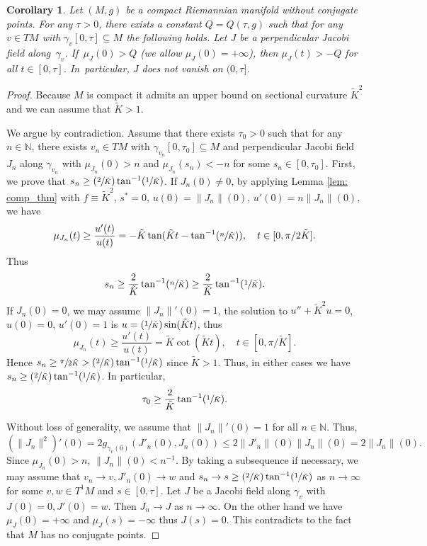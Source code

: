 \documentclass[JEP,XML,SOM,Unicode,NoFloatCountersInSection]{cedram}
\newcommand{\Psfrac}[2]{(\sfrac{#1}{#2})}
\newtheorem{corollary}[theorem]{Corollary}
\theoremstyle{definition}
\renewcommand{\>}{{\rangle}}
\newcommand{\<}{{\langle}}
\begin{document}
\begin{corollary}\label{cor: bdd_time_bdd_mu}
Let $(M, g)$ be a compact Riemannian manifold without conjugate points. For any $\tau>0$, there exists a constant $Q=Q(\tau, g)$ such that for any $v\in TM$ with $\gamma_v[0,\tau]\subseteq M$ the following holds. Let $J$ be a perpendicular Jacobi field along~$\gamma_v$. If~$\mu_J(0)>Q$ (we allow $\mu_J(0)=+\infty$), then $\mu_J(t)>-Q$ for all $t\in[0,\tau]$. In~particular, $J$ does not vanish on $(0,\tau]$.
\end{corollary}
\begin{proof}
Because $M$ is compact it admits an upper bound on sectional curvature $\tilde{K}^2$ and we can assume that $\tilde K>1$.

We argue by contradiction. Assume that there exists $\tau_0>0$ such that for any $n\in\mathbb N$, there exists $v_n\in TM$ with $\gamma_{v_n}[0,\tau_0]\subseteq M$ and perpendicular Jacobi field $J_n$ along $\gamma_{v_n}$ with $\mu_{J_n}(0)>n$ and $\mu_{J_n}(s_n)<-n$ for some $s_n\in[0,\tau_0]$. First, we prove that $s_n\geq \Psfrac{2}{\tilde K}\tan^{-1}\Psfrac{1}{\tilde K}$. If $J_n(0)\neq 0$, by applying Lemma \ref{lem: comp_thm} with $f\equiv \tilde{K}^2$, $s^*=0$, $u(0)=\|J_n\|(0)$, $u'(0)=n\|J_n\|(0)$, we have
\[
\mu_{J_n}(t)\geq \frac{u'(t)}{u(t)}=-\tilde{K}\tan(\tilde{K}t-\tan^{-1}\Psfrac{n}{\tilde{K}}), \quad t\in [0,\pi/2\tilde{K}].
\]
Thus
\[
s_n\geq \frac{2}{\tilde K}\tan^{-1}\Psfrac{n}{\tilde K}\geq \frac{2}{\tilde K}\tan^{-1}\Psfrac{1}{\tilde K}.
\]
If $J_n(0)= 0$, we may assume $\|J_n\|'(0)=1$, the solution to $u''+\tilde{K}^2u=0$, $u(0)=0$, $u'(0)=1$ is $u=\Psfrac{1}{\tilde K}\sin(\tilde{K}t)$, thus
\[
\mu_{J_n}(t)\geq \frac{u'(t)}{u(t)}=\tilde K \cot(\tilde{K}t), \quad t\in [0,\pi/\tilde{K}].
\]
Hence $s_n\geq \sfrac{\pi}{2\tilde{K}}>\Psfrac{2}{\tilde K}\tan^{-1}\Psfrac{1}{\tilde K}$ since $\tilde{K}>1$. Thus, in either cases we have $s_n\geq \Psfrac{2}{\tilde K}\tan^{-1}\Psfrac{1}{\tilde K}$. In particular,
\[
\tau_0\geq \frac{2}{\tilde K}\tan^{-1}\Psfrac{1}{\tilde K}.
\]

Without loss of generality, we assume that $\|J_n\|'(0)=1$ for all $n\in\mathbb N$. Thus,
\begin{equation*}
\left(\|J_n\|^2\right)'(0)=2g_{\gamma_v(0)}(J'_n(0), J_n(0))\leq 2\| J'_n\|(0)\|J_n\|(0)= 2\|J_n\|(0).
\end{equation*}
Since $\mu_{J_n}(0)>n$, $\|J_n\|(0)< n^{-1}$. By taking a subsequence if necessary, we may assume that $v_n\to v, J'_n(0)\to w$ and $s_n\to s\geq \Psfrac{2}{\tilde K}\tan^{-1}\Psfrac{1}{\tilde K}$ as $n\to\infty$ for some $v,w\in T^1M$ and $s\in[0,\tau]$. Let $J$ be a Jacobi field along $\gamma_v$ with $J(0)=0, J'(0)=w$. Then $J_n\to J$ as $n\to\infty$. On the other hand we have $\mu_J(0)=+\infty$ and $\mu_J(s)=-\infty$ thus $J(s)=0$. This contradicts to the fact that $M$ has no conjugate points.
\end{proof}
\end{document}
